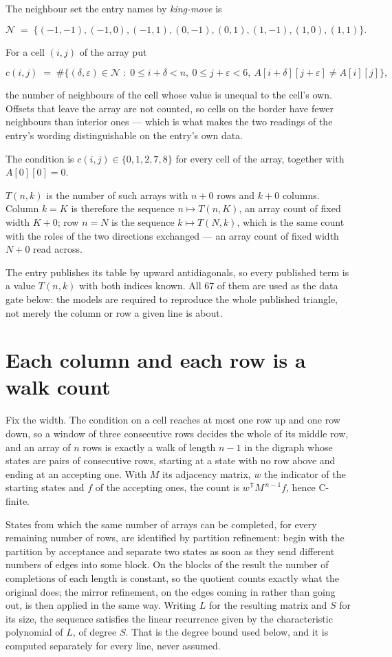 \documentclass[11pt]{article}
\theoremstyle{definition}
\begin{document}
The neighbour set the entry names by {\itshape king-move} is

\[\mathcal{N} \;=\; \{(-1,-1), (-1,0), (-1,1), (0,-1), (0,1), (1,-1), (1,0), (1,1)\}.\]

For a cell $(i,j)$ of the array put

\[c(i,j) \;=\; \#\bigl\{(\delta,\varepsilon)\in\mathcal{N} \;:\; 0\le i+\delta<n,\ 0\le j+\varepsilon<6,\ A[i+\delta][j+\varepsilon] \neq A[i][j]\bigr\},\]

the number of neighbours of the cell whose value is unequal to the cell's own. Offsets that leave the array are not counted, so cells on the border have fewer neighbours than interior ones --- which is what makes the two readings of the entry's wording distinguishable on the entry's own data.

The condition is $c(i,j) \in \{0, 1, 2, 7, 8\}$ for every cell of the array, together with $A[0][0]=0$.

$T(n,k)$ is the number of such arrays with $n + 0$ rows and $k + 0$ columns. Column $k = K$ is therefore the sequence $n \mapsto T(n,K)$, an array count of fixed width $K + 0$; row $n = N$ is the sequence $k \mapsto T(N,k)$, which is the same count with the roles of the two directions exchanged --- an array count of fixed width $N + 0$ read across.

The entry publishes its table by upward antidiagonals, so every published term is a value $T(n,k)$ with both indices known. All 67 of them are used as the data gate below: the models are required to reproduce the whole published triangle, not merely the column or row a given line is about.

\section{Each column and each row is a walk count}

Fix the width. The condition on a cell reaches at most one row up and one row down, so a window of three consecutive rows decides the whole of its middle row, and an array of $n$ rows is exactly a walk of length $n-1$ in the digraph whose states are pairs of consecutive rows, starting at a state with no row above and ending at an accepting one. With $M$ its adjacency matrix, $w$ the indicator of the starting states and $f$ of the accepting ones, the count is $w^{\mathsf T}M^{\,n-1}f$, hence C-finite.

States from which the same number of arrays can be completed, for every remaining number of rows, are identified by partition refinement: begin with the partition by acceptance and separate two states as soon as they send different numbers of edges into some block. On the blocks of the result the number of completions of each length is constant, so the quotient counts exactly what the original does; the mirror refinement, on the edges coming in rather than going out, is then applied in the same way. Writing $L$ for the resulting matrix and $S$ for its size, the sequence satisfies the linear recurrence given by the characteristic polynomial of $L$, of degree $S$. That is the degree bound used below, and it is computed separately for every line, never assumed.
\end{document}
